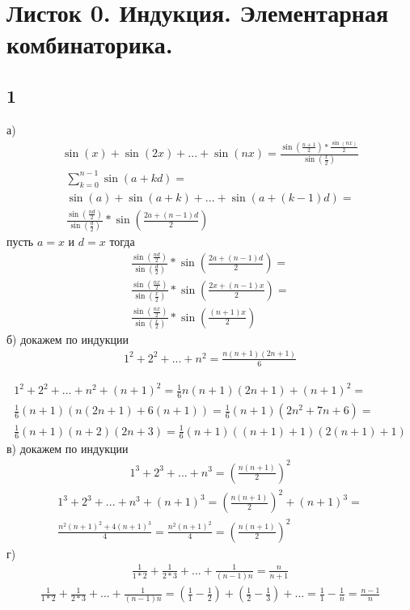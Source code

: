 \newpage
	\section*{Листок 0. Индукция. Элементарная комбинаторика.}
		\subsection{1}
		а)\newline
		\begin{gather*}
		\sin(x) + \sin(2x) + ... + \sin(nx) = \frac{\sin(\frac{n+1}{2}) * \frac{\sin(nx)}{2}}{\sin(\frac{x}{2})}
		\end{gather*}
		\begin{gather*}
		\sum_{k = 0}^{n-1} \sin(a + kd) =\\ \sin(a) + \sin(a+k) + ... + \sin(a + (k-1)d) =\\ \frac{\sin(\frac{nd}{2})}{\sin(\frac{d}{2})} * \sin(\frac{2a + (n-1)d}{2})
		\end{gather*}
		пусть $a = x$ и $d = x$ тогда
		\begin{gather*}
		\frac{\sin(\frac{nd}{2})}{\sin(\frac{d}{2})} * \sin(\frac{2a + (n-1)d}{2}) =\\ \frac{\sin(\frac{nx}{2})}{\sin(\frac{x}{2})} * \sin(\frac{2x + (n-1)x}{2}) =\\
		\frac{\sin(\frac{nx}{2})}{\sin(\frac{x}{2})} * \sin(\frac{(n+1)x}{2})
		\end{gather*}
		б)\newline
		 докажем по индукции
		\begin{gather*}
		1^2+2^2+...+n^2 = \frac{n(n+1)(2n+1)}{6}
		\end{gather*}
		
		\begin{gather*}
		1^2+2^2+...+n^2 + (n+1)^2 = \frac{1}{6}n(n+1)(2n+1) + (n+1)^2  = \\
		\frac{1}{6}(n+1)(n(2n+1)+6(n+1)) = \frac{1}{6}(n+1)(2n^2+7n+6) = \\
		\frac{1}{6}(n+1)(n+2)(2n+3) = \frac{1}{6}(n+1)((n+1)+1)(2(n+1)+1) 
		\end{gather*}
		в)\newline
		 докажем по индукции
		\begin{gather*}
		1^3+2^3+...+n^3 = (\frac{n(n+1)}{2})^2
		\end{gather*}
		\begin{gather*}
		1^3+2^3+...+n^3 +(n+1)^3 = (\frac{n(n+1)}{2})^2 +(n+1)^3 =\\
		\frac{n^2(n+1)^2 + 4(n+1)^3}{4} = \frac{n^2(n+1)^2}{4} = (\frac{n(n+1)}{2})^2
		\end{gather*}
		\newpage
		г)\newline
		\begin{gather*}
		\frac{1}{1*2} + \frac{1}{2*3} + ... + \frac{1}{(n-1)n} = \frac{n}{n+1}
		\end{gather*}
		\begin{gather*}
		\frac{1}{1*2} + \frac{1}{2*3} + ... + \frac{1}{(n-1)n} = 
		(\frac{1}{1} - \frac{1}{2}) + (\frac{1}{2} - \frac{1}{3}) + ... = \frac{1}{1} - \frac{1}{n} = \frac{n-1}{n}
		\end{gather*}
